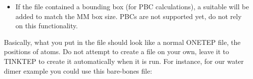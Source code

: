 \documentclass[letterpaper,10pt,english]{sphinxmanual}
\begin{document}
\begin{itemize}
\item {} 
If the  file contained a bounding box (for PBC calculations),
a suitable  will be added to match the MM box
size. PBCs are not supported yet, do not rely on this functionality.

\end{itemize}

Basically, what you put in the  file should look like a
normal ONETEP  file,  the positions of atoms. Do not
attempt to create a  file on your own, leave it to TINKTEP to
create it automatically when it is run. For instance, for our water
dimer example you could use this bare-bones  file:

%
\end{document}

